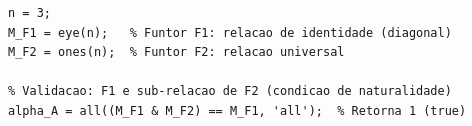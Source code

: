 \begin{lstlisting}[style=matlab, caption={Verificação da transformação natural $\alpha: F_1 \Rightarrow F_2$ em $\mathbf{Sub} \to \mathbf{Rel}$}]
n = 3;
M_F1 = eye(n);   % Funtor F1: relacao de identidade (diagonal)
M_F2 = ones(n);  % Funtor F2: relacao universal

% Validacao: F1 e sub-relacao de F2 (condicao de naturalidade)
alpha_A = all((M_F1 & M_F2) == M_F1, 'all');  % Retorna 1 (true)
\end{lstlisting}